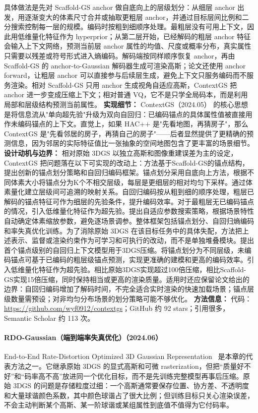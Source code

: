 具体做法是先对 Scaffold-GS anchor 做自底向上的层级划分：从细层 anchor 出发，用逐渐变大的体素尺寸合并或抽取更粗层 anchor，并通过目标层间比例和二分搜索控制每一层的规模。编码时按粗到细顺序处理。最粗层没有可用上下文，因此用低维量化特征作为 hyperprior；从第二层开始，已经解码的粗层 anchor 特征会输入上下文网络，预测当前层 anchor 属性的均值、尺度或概率分布，真实属性只需要以残差或符号形式进入熵编码。解码端按同样顺序恢复 anchor，再由 Scaffold-GS 的 anchor-to-Gaussian 解码器生成可渲染高斯；论文还使用 anchor forward，让粗层 anchor 可以直接参与后续层生成，避免上下文只服务编码而不服务渲染。相对 Scaffold-GS 只用 anchor 生成视角自适应高斯，ContextGS 把 anchor 进一步变成压缩上下文；相对普通 VQ，它不是只学全局码本，而是利用局部和层级结构预测当前属性。
\textbf{实现细节：} ContextGS（2024.05） 的核心思想是将信息流从"单向超先验"升级为双向自回归：已编码锚点的具体属性值被直接用作未编码锚点的上下文。直觉上，如果 HAC++ 是"先看地图，再猜房子"，那么 ContextGS 是"先看邻居的房子，再猜自己的房子"——后者显然提供了更精确的预测信息，因为邻居的实际特征值比一张抽象的空间地图包含了更丰富的场景细节。
\textbf{设计动机与边界：} 相对原始 3DGS 以独立高斯和图像重建误差为主的设定，ContextGS 把问题落在以下可实现的改动上：方法基于Scaffold-GS的锚点结构，提出创新的锚点划分策略和自回归编码框架。锚点划分采用自底向上方法，根据不同体素大小将锚点分为K个不相交层级，每层是更细层的相对均匀下采样。通过体素量化建立层级间可追溯的映射关系。自回归编码按从粗到细的顺序处理，粗层已解码的锚点特征可作为细层的先验条件，提升编码效率。对于最粗层无已编码锚点的情况，引入低维量化特征作为超先验。提出自适应参数搜索策略，根据场景特性自动确定体素缩放参数，避免逐场景调参。整体框架包括锚点划分、自回归熵编码和率失真优化训练。为了消除原始 3DGS 在该目标任务中的具体失配，方法把上述表示、监督或渲染约束作为可学习和可执行的改动，而不是单独堆叠模块。提出首个锚点级别的自回归上下文模型用于3DGS压缩。将锚点划分为不同层级，未编码锚点可基于已编码的粗层级锚点预测，实现更准确的建模和更高的编码效率。引入低维量化特征作为超先验。相比原始3DGS实现超过100倍压缩，相比Scaffold-GS实现15倍压缩，同时保持相当或更高的渲染质量。适用时还应保留论文给出的边界：自回归编码增加了解码时间，不完全适合实时渲染的快速加载场景；锚点层级数量需预设；对非均匀分布场景的划分策略可能不够优化。
\textbf{方法信息：} 代码：\url{https://github.com/wyf0912/contextgs}；GitHub 约 92 stars；引用很多，Semantic Scholar 约 113 次。



\paragraph{RDO-Gaussian（端到端率失真优化）（2024.06）}
End-to-End Rate-Distortion Optimized 3D Gaussian Representation~\cite{2406_01597} 是本章的代表方法之一。它继承原始 3DGS 的显式高斯和可微 rasterization，但把“质量好不好”和“码率高不高”放进同一个优化目标，而不是先训练完整模型再事后压缩。原始 3DGS 的问题是存储粒度过细：一个高斯通常要保存位置、协方差、不透明度和大量球谐颜色系数，其中颜色球谐占了很大比例；但训练目标只关心渲染误差，不会主动判断某个高斯、某一阶球谐或某组属性到底值不值得为它付码率。

